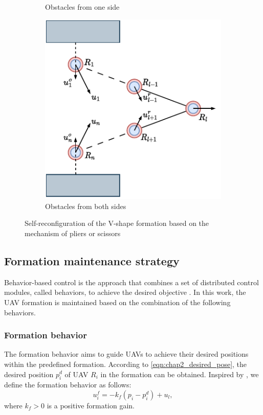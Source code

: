 \begin{figure}
\begin{subfigure}[b]{0.32\textwidth}
    \caption{Obstacles from one side}
    \label{fig:chap2_reconfig1}
    \end{subfigure}
    \begin{subfigure}[b]{0.32\textwidth}
    \includegraphics[width=\textwidth]{paper1/images/reconfiguration2.pdf}
    \caption{Obstacles from both sides}
    \label{fig:chap2_reconfig2}
    \end{subfigure}
    \caption{Self-reconfiguration of the V-shape formation based on the mechanism of pliers or scissors}
    \label{fig:chap2_reconfiguration}
\end{figure}

\subsection{Formation maintenance strategy}
Behavior-based control is the approach that combines a set of distributed control modules, called behaviors, to achieve the desired objective \cite{Mataric2008, 736776}. In this work, the UAV formation is maintained based on the combination of the following behaviors.
\subsubsection{Formation behavior}
The formation behavior aims to guide UAVs to achieve their desired positions within the predefined formation. According to \eqref{eqn:chap2_desired_pose}, the desired position $p_i^d$ of UAV $R_i$ in the formation can be obtained. Inspired by \cite{Dang2019,MirzaeeKahagh2020}, we define the formation behavior as follows:
\begin{equation}
    u_i^f=-k_f\left(p_i- p_i^d\right) + u_l,
    \label{eqn:chap2_uf}
\end{equation}
where $k_f>0$ is a positive formation gain. 

